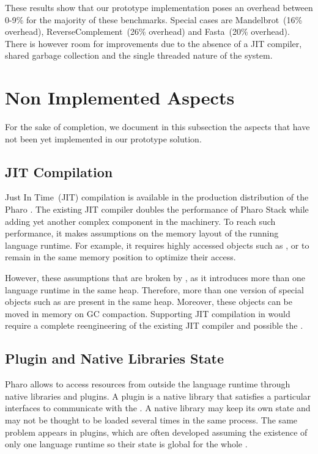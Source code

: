 These results show that our prototype implementation poses an overhead between 0-9\% for the majority of these benchmarks. Special cases are Mandelbrot~(16\% overhead), ReverseComplement~(26\% overhead) and Fasta~(20\% overhead).
There is however room for improvements due to the absence of a JIT compiler, shared garbage collection and the single threaded nature of the system.


\section{Non Implemented Aspects} \label{sec:not_yet_implemented}
 
For the sake of completion, we document in this subsection the aspects that have not been yet implemented in our prototype solution.

\subsection{JIT Compilation}

Just In Time~(JIT) compilation is available in the production distribution of the Pharo \VM. The existing JIT compiler doubles the performance of Pharo Stack \VM while adding yet another complex component in the \VM machinery. To reach such performance, it makes assumptions on the memory layout of the running language runtime. For example, it requires highly accessed objects such as ,  or  to remain in the same memory position to optimize their access.

However, these assumptions that are broken by \Vtt, as it introduces more than one language runtime in the same heap. Therefore, more than one version of special objects such as  are present in the same heap. Moreover, these objects can be moved in memory on GC compaction. Supporting JIT compilation in \Vtt would require a complete reengineering of the existing JIT compiler and possible the \VM.

\subsection{Plugin and Native Libraries State}

Pharo \VM allows to access resources from outside the language runtime through native libraries and \VM plugins. A \VM plugin is a native library that satisfies a particular interfaces to communicate with the \VM. A native library may keep its own state and may not be thought to be loaded several times in the same process. The same problem appears in \VM plugins, which are often developed assuming the existence of only one language runtime so their state is global for the whole \VM.


